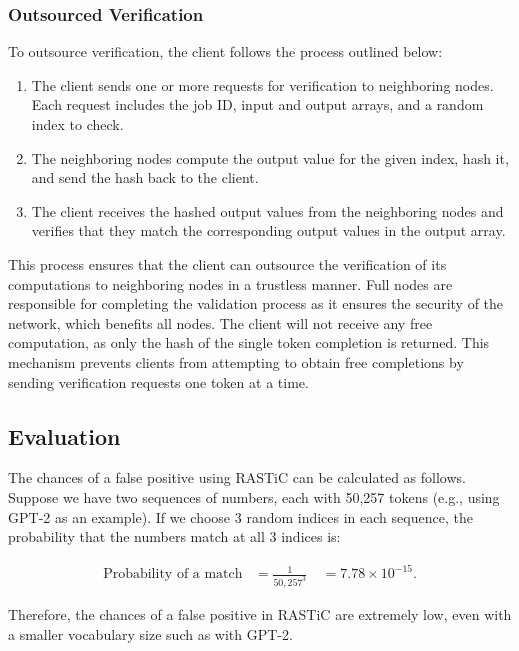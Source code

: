 \documentclass{article}
\begin{document}
\subsubsection{Outsourced Verification}
To outsource verification, the client follows the process outlined below:
\begin{enumerate}
\item The client sends one or more requests for verification to neighboring nodes. Each request includes the job ID, input and output arrays, and a random index to check.
\item The neighboring nodes compute the output value for the given index, hash it, and send the hash back to the client.
\item The client receives the hashed output values from the neighboring nodes and verifies that they match the corresponding output values in the output array.
\end{enumerate}

This process ensures that the client can outsource the verification of its computations to neighboring nodes in a trustless manner.
Full nodes are responsible for completing the validation process as it ensures the security of the network, which benefits all nodes. 
The client will not receive any free computation, as only the hash of the single token completion is returned. 
This mechanism prevents clients from attempting to obtain free completions by sending verification requests one token at a time.

\subsection{Evaluation}

The chances of a false positive using \ac{RASTiC} can be calculated as follows. 
Suppose we have two sequences of numbers, each with 50,257 tokens (e.g., using GPT-2 as an example). 
If we choose 3 random indices in each sequence, the probability that the numbers match at all 3 indices is:

\begin{align*}
\text{Probability of a match} &= \frac{1}{50,257^3} \
&= 7.78 \times 10^{-15}.
\end{align*}

Therefore, the chances of a false positive in \ac{RASTiC} are extremely low, even with a smaller vocabulary size such as with GPT-2.
\end{document}
